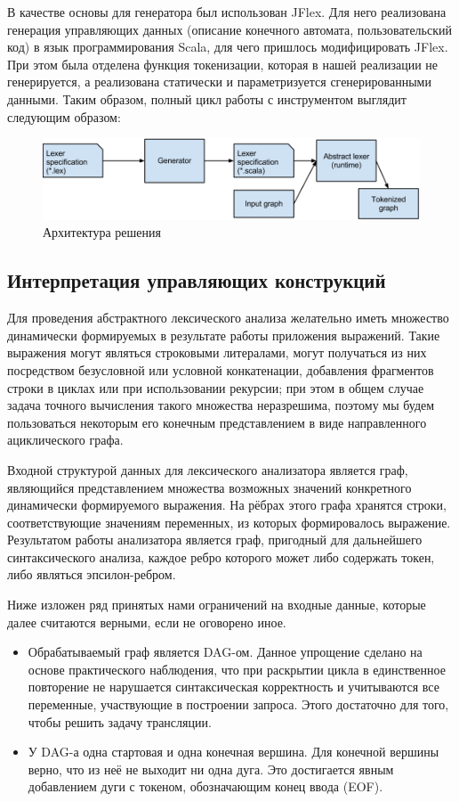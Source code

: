 В качестве основы для генератора был использован JFlex. Для него реализована генерация управляющих 
данных (описание конечного автомата, пользовательский код) в язык 
программирования Scala, для чего пришлось модифицировать JFlex. При этом была 
отделена функция токенизации, которая в нашей реализации не генерируется, а 
реализована статически и параметризуется сгенерированными данными. Таким образом, 
полный цикл работы с инструментом выглядит следующим образом:

\begin{figure}[h]
 \label{Arch}
 \centering
 \includegraphics[width=12cm]{Verbitskaya/AL_base_arch.png}
 \caption{Архитектура решения}
 \label{Arch}
\end{figure}

\subsection{Интерпретация управляющих конструкций}
Для проведения абстрактного лексического анализа желательно иметь множество 
динамически формируемых в результате работы приложения выражений. Такие выражения 
могут являться строковыми литералами, могут получаться из них посредством 
безусловной или условной конкатенации, добавления фрагментов строки в циклах 
или при использовании рекурсии; при этом в общем случае задача точного вычисления такого множества 
неразрешима, поэтому мы будем пользоваться некоторым его конечным представлением 
в виде направленного ациклического графа.

Входной структурой данных для лексического анализатора является граф, являющийся 
представлением множества возможных значений конкретного динамически формируемого 
выражения. На рёбрах этого графа хранятся строки, соответствующие значениям 
переменных, из которых формировалось выражение. Результатом работы анализатора 
является граф, пригодный для дальнейшего синтаксического анализа, каждое ребро 
которого может либо содержать токен, либо являться эпсилон-ребром.

Ниже изложен ряд принятых нами ограничений на входные данные, которые далее 
считаются верными, если не оговорено иное.
\begin{itemize}
    \item Обрабатываемый граф является DAG-ом. Данное упрощение сделано на 
    основе практического наблюдения, что при раскрытии цикла в единственное 
    повторение не нарушается синтаксическая корректность и учитываются все 
    переменные, участвующие в построении запроса. Этого достаточно для того, 
    чтобы решить задачу трансляции. 
    \item У DAG-а одна стартовая и одна конечная вершина. Для конечной вершины 
    верно, что из неё не выходит ни одна дуга. Это достигается явным добавлением 
    дуги с токеном, обозначающим конец ввода (EOF).
\end{itemize}

